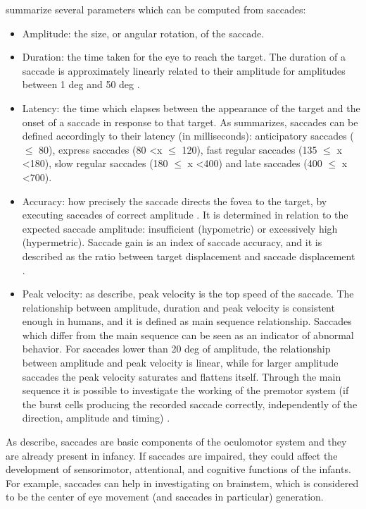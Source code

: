 \cite{brenner2007visualsearch} summarize several parameters which can be computed from saccades:
\begin{itemize}
    \item Amplitude: the size, or angular rotation, of the saccade.
    \item Duration: the time taken for the eye to reach the target. The duration of a saccade is approximately linearly related to their amplitude for amplitudes between 1 deg and 50 deg \citep[p. 172]{leigh2015neurology}.
    \item Latency: the time which elapses between the appearance of the target and the onset of a saccade in response to that target. As \cite{smyrnis2008guidelines} summarizes, saccades can be defined accordingly to their latency (in milliseconds): anticipatory saccades ( \(\leq\) 80), express saccades (80 \textless x \(\leq\) 120), fast regular saccades (135 \(\leq\) x \textless 180), slow regular saccades (180 \(\leq\) x \textless 400) and late saccades (400 \(\leq\) x \textless 700). 
    \item Accuracy: how precisely the saccade directs the fovea to the target, by executing saccades of correct amplitude \citep{pensiero2009saccades}. It is determined in relation to the expected saccade amplitude: insufficient (hypometric) or excessively high (hypermetric). Saccade gain is an index of saccade accuracy, and it is described as the ratio between target displacement and saccade displacement \citep{johnson2016review}.
    \item Peak velocity: as \citet[pp. 171-172]{leigh2015neurology} describe, peak velocity is the top speed of the saccade. The relationship between amplitude, duration and peak velocity is consistent enough in humans, and it is defined as main sequence relationship. Saccades which differ from the main sequence can be seen as an indicator of abnormal behavior. For saccades lower than 20 deg of amplitude, the relationship between amplitude and peak velocity is linear, while for larger amplitude saccades the peak velocity saturates and flattens itself. Through the main sequence it is possible to investigate the working of the premotor system (if the burst cells producing the recorded saccade correctly, independently of the direction, amplitude and timing) \citep{pensiero2009saccades}.
\end{itemize}

As \cite{pensiero2009saccades} describe, saccades are basic components of the oculomotor system and they are already present in infancy. If saccades are impaired, they could affect the development of sensorimotor, attentional, and cognitive functions of the infants. For example, saccades can help in investigating on brainstem, which is considered to be the center of eye movement (and saccades in particular) generation.

